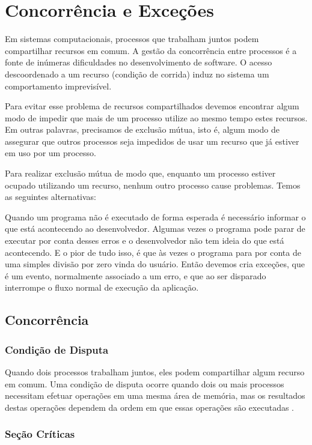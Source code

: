 \chapter{Concorrência e Exceções}

Em sistemas computacionais, processos que trabalham juntos podem compartilhar 
recursos em comum. A gestão da concorrência entre processos é a fonte de inúmeras 
dificuldades no desenvolvimento de software. O acesso descoordenado a um recurso 
(condição de corrida) induz no sistema um comportamento imprevisível.

Para evitar esse problema de recursos compartilhados devemos encontrar algum modo de impedir 
que mais de um processo utilize ao mesmo tempo estes recursos. Em outras palavras, precisamos 
de exclusão mútua, isto é, algum modo de assegurar que outros processos seja impedidos de usar 
um recurso que já estiver em uso por um processo.

Para realizar exclusão mútua de modo que, enquanto um processo estiver ocupado utilizando um 
recurso, nenhum outro processo cause problemas. Temos as seguintes alternativas:

Quando um programa não é executado de forma esperada é necessário informar o que está acontecendo ao desenvolvedor. Algumas vezes o programa pode parar de executar por conta desses erros e o desenvolvedor não tem ideia do que está acontecendo. E o pior de tudo isso, é que às vezes o programa para por conta de uma simples divisão por zero vinda do usuário. Então devemos cria exceções, que é um evento, normalmente associado a um erro, e que ao ser disparado interrompe o fluxo normal de execução da aplicação.

\section{Concorrência}

\subsection{Condição de Disputa}

Quando dois processos trabalham juntos, eles podem compartilhar algum recurso em comum. Uma condição de disputa ocorre quando dois ou mais processos necessitam efetuar operações em uma mesma área de memória, mas os resultados destas operações dependem da ordem em que essas operações são executadas \cite{tanen}.

\subsection{Seção Críticas}

